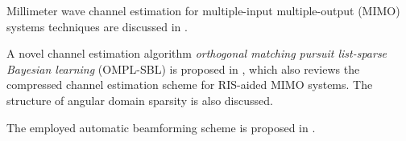 Millimeter wave channel estimation for multiple-input multiple-output (MIMO) systems
techniques are discussed in \cite{lee2016channel}.

A novel channel estimation algorithm
\textit{orthogonal matching pursuit list-sparse Bayesian learning} (OMPL-SBL)
is proposed in \cite{zhao2023ompl},
which also reviews the compressed channel estimation scheme for RIS-aided MIMO systems.
The structure of angular domain sparsity is also discussed.

The employed automatic beamforming scheme is proposed in \cite{you2023beam}.
